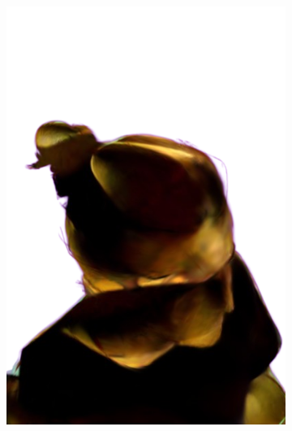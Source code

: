 \begin{figure}[ht]
	\centering
	\begin{subfigure}{0.2\linewidth}
		\includegraphics[width=\textwidth]{Figures/failed/cowboy/15_render-removebg-preview.png}
	\end{subfigure}
	\begin{subfigure}{0.2\linewidth}

\end{subfigure}
\end{figure}
